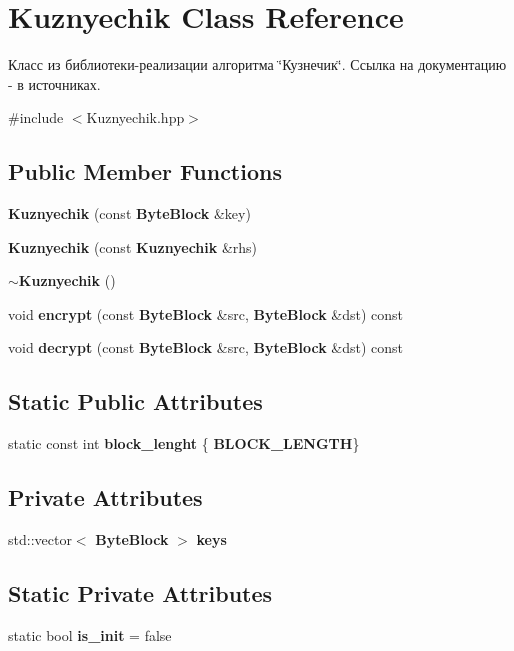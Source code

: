 \section{Kuznyechik Class Reference}
\label{class_kuznyechik}


Класс из библиотеки-\/реализации алгоритма \char`\"{}Кузнечик\char`\"{}. Ссылка на документацию -\/ в источниках.  




{\ttfamily \#include $<$Kuznyechik.\+hpp$>$}

\subsection*{Public Member Functions}
\begin{DoxyCompactItemize}
\item 
\textbf{ Kuznyechik} (const \textbf{ Byte\+Block} \&key)
\item 
\textbf{ Kuznyechik} (const \textbf{ Kuznyechik} \&rhs)
\item 
\textbf{ $\sim$\+Kuznyechik} ()
\item 
void \textbf{ encrypt} (const \textbf{ Byte\+Block} \&src, \textbf{ Byte\+Block} \&dst) const
\item 
void \textbf{ decrypt} (const \textbf{ Byte\+Block} \&src, \textbf{ Byte\+Block} \&dst) const
\end{DoxyCompactItemize}
\subsection*{Static Public Attributes}
\begin{DoxyCompactItemize}
\item 
static const int \textbf{ block\+\_\+lenght} \{\textbf{ B\+L\+O\+C\+K\+\_\+\+L\+E\+N\+G\+TH}\}
\end{DoxyCompactItemize}
\subsection*{Private Attributes}
\begin{DoxyCompactItemize}
\item 
std\+::vector$<$ \textbf{ Byte\+Block} $>$ \textbf{ keys}
\end{DoxyCompactItemize}
\subsection*{Static Private Attributes}
\begin{DoxyCompactItemize}
\item 
static bool \textbf{ is\+\_\+init} = false
\end{DoxyCompactItemize}


